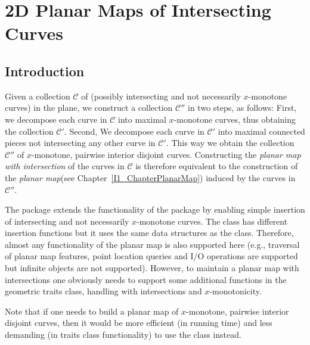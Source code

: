
\chapter{2D Planar Maps of Intersecting Curves} 
\label{I1_ChapterPmwx}

\section{Introduction}

Given a collection ${\mathcal C}$ of (possibly intersecting and not necessarily
$x$-monotone curves) in the plane, we construct a collection ${\mathcal C}''$ in
two steps, as follows: First, we decompose each curve in ${\mathcal C}$ into
maximal $x$-monotone curves, thus obtaining the collection
${\mathcal C}'$. Second, We decompose each curve in ${\mathcal C}'$ into 
maximal connected pieces not intersecting any other curve in ${\mathcal C}'$.
This way we obtain the collection ${\mathcal C}''$ of $x$-monotone, pairwise 
interior disjoint curves.  Constructing the {\it planar map with 
intersection} of the curves in ${\mathcal C}$ is therefore equivalent to the
construction of the {\it planar map}(see Chapter~\ref{I1_ChapterPlanarMap}) 
induced by the curves in ${\mathcal C}''$.

The  package extends the functionality 
of the  package by enabling simple insertion of intersecting 
and not necessarily $x$-monotone curves. The 
 class has different insertion functions 
but it uses the same data structures as the  class. 
Therefore, almost any functionality of the planar map is also supported here 
(e.g., traversal of planar map features, point location queries and I/O 
operations are supported but infinite objects are not supported). However, 
to maintain a planar map with intersections one obviously needs to support 
some additional functions in the geometric traits class, handling with 
intersections and $x$-monotonicity.

Note that if one needs to build a planar map of $x$-monotone, pairwise 
interior disjoint curves, then it would be more efficient (in running time) 
and less demanding (in traits class functionality) to use the 
 class instead.

